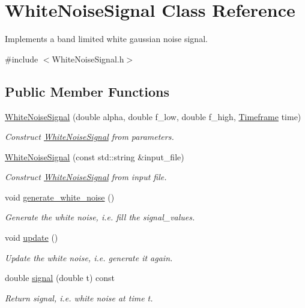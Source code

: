 \hypertarget{classWhiteNoiseSignal}{}\section{White\+Noise\+Signal Class Reference}
\label{classWhiteNoiseSignal}


Implements a band limited white gaussian noise signal.  




{\ttfamily \#include $<$White\+Noise\+Signal.\+h$>$}

\subsection*{Public Member Functions}
\begin{DoxyCompactItemize}
\item 
\hyperlink{classWhiteNoiseSignal_a40d605203e6eb323068d7065ee10d106}{White\+Noise\+Signal} (double alpha, double f\+\_\+low, double f\+\_\+high, \hyperlink{classTimeframe}{Timeframe} time)
\begin{DoxyCompactList}\small\item\em Construct \hyperlink{classWhiteNoiseSignal}{White\+Noise\+Signal} from parameters. \end{DoxyCompactList}\item 
\hyperlink{classWhiteNoiseSignal_a0acc2c322f582e4e416e75bb1e1ecd16}{White\+Noise\+Signal} (const std\+::string \&input\+\_\+file)
\begin{DoxyCompactList}\small\item\em Construct \hyperlink{classWhiteNoiseSignal}{White\+Noise\+Signal} from input file. \end{DoxyCompactList}\item 
\mbox{\label{classWhiteNoiseSignal_a91805eb88b0dc19034cfaca47f248110}} 
void \hyperlink{classWhiteNoiseSignal_a91805eb88b0dc19034cfaca47f248110}{generate\+\_\+white\+\_\+noise} ()
\begin{DoxyCompactList}\small\item\em Generate the white noise, i.\+e. fill the signal\+\_\+values. \end{DoxyCompactList}\item 
\mbox{\label{classWhiteNoiseSignal_a7329f5dcabc68fea9d60fef98c064869}} 
void \hyperlink{classWhiteNoiseSignal_a7329f5dcabc68fea9d60fef98c064869}{update} ()
\begin{DoxyCompactList}\small\item\em Update the white noise, i.\+e. generate it again. \end{DoxyCompactList}\item 
double \hyperlink{classWhiteNoiseSignal_a99ec1e0c59f5ded7623ffbcaa5318238}{signal} (double t) const
\begin{DoxyCompactList}\small\item\em Return signal, i.\+e. white noise at time t. \end{DoxyCompactList}\end{DoxyCompactItemize}


